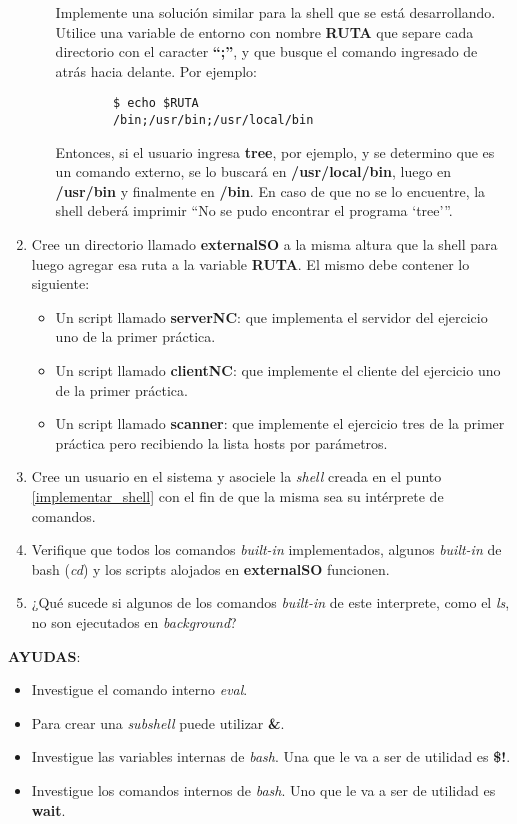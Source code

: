 \begin{enumerate}
\begin{enumerate}
	    
	    Implemente una solución similar para la shell que se está desarrollando. Utilice una variable de entorno con nombre \textbf{RUTA} que separe cada directorio con el caracter \textbf{``;''}, y que busque el comando ingresado de atrás hacia delante. Por ejemplo:
	    \begin{lstlisting}
		$ echo $RUTA
		/bin;/usr/bin;/usr/local/bin
	    \end{lstlisting}
	    Entonces, si el usuario ingresa \textbf{tree}, por ejemplo, y se determino que es un comando externo, se lo buscará en \textbf{/usr/local/bin}, luego en \textbf{/usr/bin} y finalmente en \textbf{/bin}. En caso de que no se lo encuentre, la shell deberá imprimir ``No se pudo encontrar el programa `tree'''.
      \end{enumerate}

      \item Cree un directorio llamado \textbf{externalSO} a la misma altura que la shell para luego agregar esa ruta a la variable \textbf{RUTA}. El mismo debe contener lo siguiente: \label{puntoComandosExternos}
      \begin{itemize}
      	\item Un script llamado \textbf{serverNC}: que implementa el servidor del ejercicio uno de la primer práctica. 
      	\item Un script llamado \textbf{clientNC}: que implemente el cliente del ejercicio uno de la primer práctica.
      	\item Un script llamado \textbf{scanner}: que implemente el ejercicio tres de la primer práctica pero recibiendo la lista hosts por parámetros.
      \end{itemize}
      
      \item Cree un usuario en el sistema y asociele la \textit{shell} creada en el punto \ref{implementar_shell} con el fin de que la misma sea su intérprete de comandos.
      
      \item Verifique que todos los comandos \textit{built-in} implementados, algunos \textit{built-in} de bash (\textit{cd}) y los scripts alojados en \textbf{externalSO} funcionen.

      \item ¿Qué sucede si algunos de los comandos \textit{built-in} de este interprete, como el \textit{ls}, no son ejecutados en \textit{background}?

\end{enumerate}

\textbf{AYUDAS}:
\begin{itemize}
	\item Investigue el comando interno \textit{eval}.
	\item Para crear una \textit{subshell} puede utilizar \textbf{\&}.
	\item Investigue las variables internas de \emph{bash}. Una que le va a ser de utilidad es \textbf{\$!}.
	\item Investigue los comandos internos de \emph{bash}. Uno que le va a ser de utilidad es \textbf{wait}.
\end{itemize}